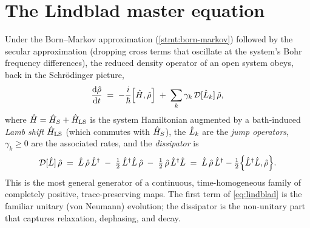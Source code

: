\section{The Lindblad master equation}
\label{sec:lindblad}

\begin{statement}
\label{stmt:lindblad}
Under the Born--Markov approximation (\cref{stmt:born-markov})
followed by the secular approximation (dropping cross terms that
oscillate at the system's Bohr frequency differences), the reduced
density operator of an open system obeys, back in the Schrödinger
picture,
\begin{equation}
\label{eq:lindblad}
\frac{\dd\op\rho}{\dd t}
\;=\; -\frac{i}{\hbar}\comm{\op H}{\op\rho}
\;+\; \sum_k \gamma_k\,\mathcal D[\op L_k]\,\op\rho,
\end{equation}
where $\hat{H}=\hat{H}_S+\hat{H}_{\rm LS}$ is the system Hamiltonian
augmented by a bath-induced \emph{Lamb shift} $\hat{H}_{\rm LS}$
(which commutes with $\hat{H}_S$), the $\hat{L}_k$ are the
\emph{jump operators}, $\gamma_k\geq 0$ are the associated rates,
and the \emph{dissipator} is
\begin{equation}
\label{eq:dissipator}
\mathcal D[\op L]\,\op\rho
\;=\; \op L\,\op\rho\,\op L^\dagger
\;-\; \tfrac12\,\op L^\dagger\op L\,\op\rho
\;-\; \tfrac12\,\op\rho\,\op L^\dagger\op L
\;=\; \op L\,\op\rho\,\op L^\dagger - \tfrac12\acomm{\op L^\dagger\op L}{\op\rho}.
\end{equation}
This is the most general generator of a continuous, time-homogeneous
family of completely positive, trace-preserving maps. The first
term of \cref{eq:lindblad} is the familiar unitary (von Neumann)
evolution; the dissipator is the non-unitary part that captures
relaxation, dephasing, and decay.
\end{statement}

